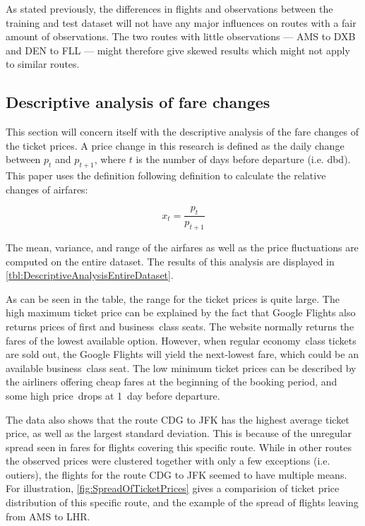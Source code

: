 As stated previously, the differences in flights and observations between the training and test dataset will not have any major influences on routes with a fair amount of observations. The two routes with little observations --- AMS to DXB and DEN to FLL --- might therefore give skewed results which might not apply to similar routes.


\subsection{Descriptive analysis of fare changes}
\label{subsec:DescriptiveAnalysisOfFareChanges}
This section will concern itself with the descriptive analysis of the fare changes of the ticket prices. A price change in this research is defined as the daily change between $p_t$ and $p_{t+1}$, where $t$ is the number of days before departure (i.e. dbd). This paper uses the definition following definition to calculate the relative changes of airfares:

$$ x_t = \frac{p_{t}}{p_{t+1}} $$

The mean, variance, and range of the airfares as well as the price fluctuations are computed on the entire dataset. The results of this analysis are displayed in \autoref{tbl:DescriptiveAnalysisEntireDataset}.

As can be seen in the table, the range for the ticket prices is quite large. The high maximum ticket price can be explained by the fact that Google Flights also returns prices of first and business~class seats. The website normally returns the fares of the lowest available option. However, when regular economy~class tickets are sold out, the Google Flights will yield the next-lowest fare, which could be an available business~class seat. The low minimum ticket prices can be described by the airliners offering cheap fares at the beginning of the booking period, and some high price~drops at 1~day before departure.

The data also shows that the route CDG to JFK has the highest average ticket price, as well as the largest standard deviation. This is because of the unregular spread seen in fares for flights covering this specific route. While in other routes the observed prices were clustered together with only a few exceptions (i.e. outiers), the flights for the route CDG to JFK seemed to have multiple means. For illustration, \autoref{fig:SpreadOfTicketPrices} gives a comparision of ticket price distribution of this specific route, and the example of the spread of flights leaving from AMS to LHR.


